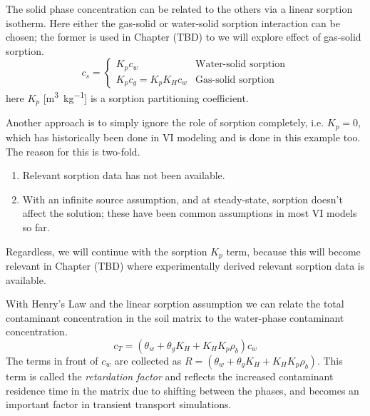 The solid phase concentration can be related to the others via a linear sorption isotherm.
Here either the gas-solid or water-solid sorption interaction can be chosen; the former is used in Chapter (TBD) to we will explore effect of gas-solid sorption. %
\begin{equation}
  c_s = \begin{cases}
    K_p c_w & \text{Water-solid sorption} \\
    K_p c_g = K_p K_H c_w & \text{Gas-solid sorption}
\end{cases}
\end{equation}
here $K_p$ [\si{\metre\cubed\per\kilogram}] is a sorption partitioning coefficient.\par

Another approach is to simply ignore the role of sorption completely, i.e. $K_p = 0$, which has historically been done in VI modeling and is done in this example too.
The reason for this is two-fold.
\begin{enumerate}
  \item Relevant sorption data has not been available.
  \item With an infinite source assumption, and at steady-state, sorption doesn't affect the solution; these have been common assumptions in most VI models so far.
\end{enumerate}
Regardless, we will continue with the sorption $K_p$ term, because this will become relevant in Chapter (TBD) where experimentally derived relevant sorption data is available.\par %

With Henry's Law and the linear sorption assumption we can relate the total contaminant concentration in the soil matrix to the water-phase contaminant concentration.
\begin{equation}
  c_T = (\theta_w + \theta_g K_H + K_H K_p \rho_b) c_w
\end{equation}
The terms in front of $c_w$ are collected as $R = (\theta_w + \theta_g K_H + K_H K_p \rho_b)$.
This term is called the \textit{retardation factor} and reflects the increased contaminant residence time in the matrix due to shifting between the phases, and becomes an important factor in transient transport simulations.\par

